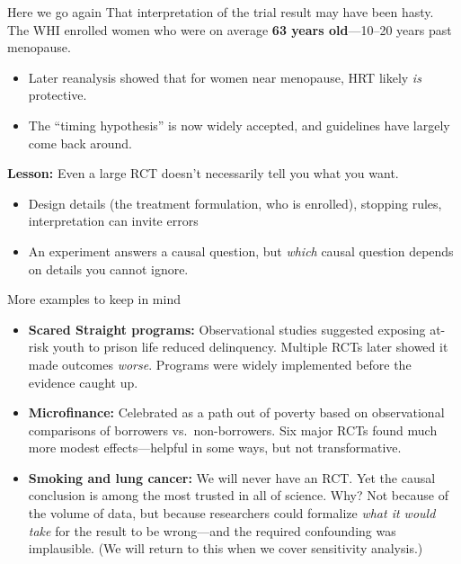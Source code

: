 \documentclass[handout,xcolor=dvipsnames,pdftex,hyperref={colorlinks=false}]{beamer}
\newcommand\makebiggaps{\addtolength{\itemsep}{.5\baselineskip}}
\begin{document}
\begin{frame}{Here we go again}
 That interpretation of the trial result may have been hasty.\\
\bigskip
{} The WHI enrolled women who were on average \textbf{63 years old}---10--20 years past menopause.\\

\begin{itemize}
\item Later reanalysis showed that for women near menopause, HRT likely \textit{is} protective. 
\item The ``timing hypothesis'' is now widely accepted, and guidelines have largely come back around.\\
\end{itemize}
\bigskip
{} \textbf{Lesson:} Even a large RCT doesn't necessarily tell you what you want.\\

\begin{itemize}
 \item<5-> Design details (the treatment formulation, who is enrolled), stopping rules, interpretation can invite errors
 \item<6-> An experiment answers a causal question, but \textit{which} causal question depends on details you cannot ignore.
 \end{itemize}
\end{frame}

\begin{frame}{More examples to keep in mind}
\small
\begin{itemize}
\makebiggaps
\item<1-> \textbf{Scared Straight programs:} Observational studies suggested exposing at-risk youth to prison life reduced delinquency. Multiple RCTs later showed it made outcomes \textit{worse}. Programs were widely implemented before the evidence caught up.
\medskip
\item<2-> \textbf{Microfinance:} Celebrated as a path out of poverty based on observational comparisons of borrowers vs.\ non-borrowers. Six major RCTs found much more modest effects---helpful in some ways, but not transformative.
\medskip
\item<3-> \textbf{Smoking and lung cancer:} We will never have an RCT. Yet the causal conclusion is among the most trusted in all of science. Why? Not because of the volume of data, but because researchers could formalize \textit{what it would take} for the result to be wrong---and the required confounding was implausible. (We will return to this when we cover sensitivity analysis.)
\end{itemize}
\end{frame}
\end{document}
